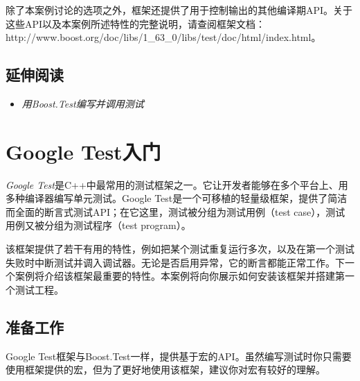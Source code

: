 
除了本案例讨论的选项之外，框架还提供了用于控制输出的其他编译期API。关于这些API以及本案例所述特性的完整说明，请查阅框架文档：http://\allowbreak{}www.\allowbreak{}boost.\allowbreak{}org/\allowbreak{}doc/\allowbreak{}libs/\allowbreak{}1\_\allowbreak{}63\_\allowbreak{}0/\allowbreak{}libs/\allowbreak{}test/\allowbreak{}doc/\allowbreak{}html/\allowbreak{}index.\allowbreak{}html。



\subsection{延伸阅读}



\begin{itemize}
\item \textit{用Boost.Test编写并调用测试}

\end{itemize}



\section{Google Test入门}



\textit{Google Test}是C++中最常用的测试框架之一。它让开发者能够在多个平台上、用多种编译器编写单元测试。Google Test是一个可移植的轻量级框架，提供了简洁而全面的断言式测试API；在它这里，测试被分组为测试用例（test case），测试用例又被分组为测试程序（test program）。



该框架提供了若干有用的特性，例如把某个测试重复运行多次，以及在第一个测试失败时中断测试并调入调试器。无论是否启用异常，它的断言都能正常工作。下一个案例将介绍该框架最重要的特性。本案例将向你展示如何安装该框架并搭建第一个测试工程。



\subsection{准备工作}



Google Test框架与Boost.Test一样，提供基于宏的API。虽然编写测试时你只需要使用框架提供的宏，但为了更好地使用该框架，建议你对宏有较好的理解。



